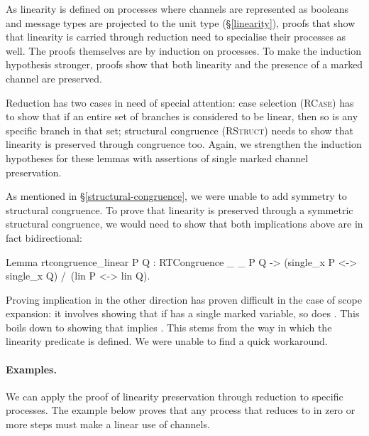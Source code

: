\documentclass{mproj}
\begin{document}


As linearity is defined on processes where channels are represented as booleans and message types are projected to the unit type (\S \ref{linearity}), proofs that show that linearity is carried through reduction need to specialise their processes as well. The proofs themselves are by induction on processes. To make the induction hypothesis stronger, proofs show that both linearity and the presence of a marked channel are preserved.


Reduction has two cases in need of special attention: case selection (\textsc{RCase}) has to show that if an entire set of branches is considered to be linear, then so is any specific branch in that set; structural congruence (\textsc{RStruct}) needs to show that linearity is preserved through congruence too. Again, we strengthen the induction hypotheses for these lemmas with assertions of single marked channel preservation.



As mentioned in \S \ref{structural-congruence}, we were unable to add symmetry to structural congruence. To prove that linearity is preserved through a symmetric structural congruence, we would need to show that both implications above are in fact bidirectional:

\begin{coq}
Lemma rtcongruence_linear {P Q} : RTCongruence _ _ P Q ->
  (single_x P <-> single_x Q) /\ (lin P <-> lin Q).
\end{coq}

Proving implication in the other direction has proven difficult in the case of scope expansion: it involves showing that if  has a single marked variable, so does . This boils down to showing that  implies . This stems from the way in which the linearity predicate is defined. We were unable to find a quick workaround.

\paragraph{Examples.}
We can apply the proof of linearity preservation through reduction to specific processes. The example below proves that any process that  reduces to in zero or more steps must make a linear use of channels.
\end{document}
